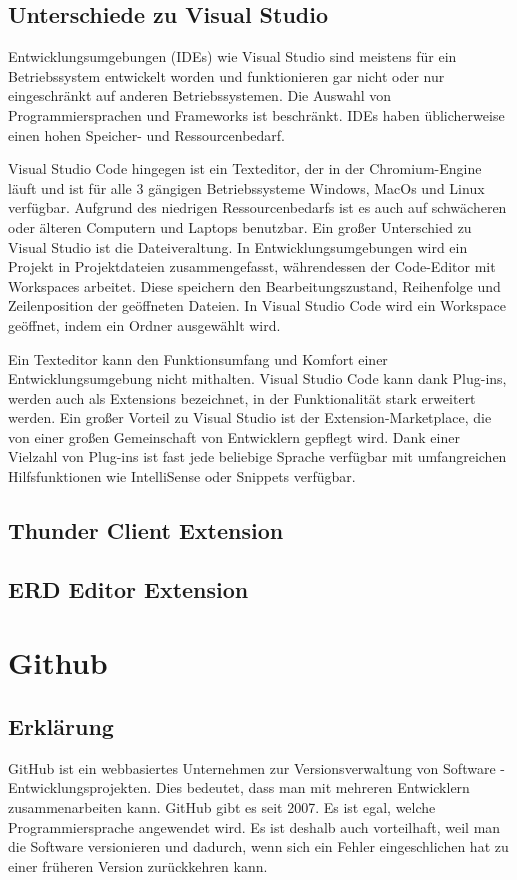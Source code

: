 \subsection{Unterschiede zu Visual Studio}
Entwicklungsumgebungen (IDEs) wie Visual Studio sind meistens für ein Betriebssystem entwickelt worden und funktionieren 
gar nicht oder nur eingeschränkt auf anderen Betriebssystemen. Die Auswahl von Programmiersprachen und Frameworks ist beschränkt. IDEs 
haben üblicherweise einen hohen Speicher- und Ressourcenbedarf.

Visual Studio Code hingegen ist ein Texteditor, der in der Chromium-Engine läuft und ist für alle 3 gängigen Betriebssysteme 
Windows, MacOs und Linux verfügbar. Aufgrund des niedrigen Ressourcenbedarfs ist es auch auf schwächeren oder älteren Computern und Laptops benutzbar.
Ein großer Unterschied zu Visual Studio ist die Dateiveraltung. 
In Entwicklungsumgebungen wird ein Projekt in Projektdateien zusammengefasst, 
währendessen der Code-Editor mit Workspaces arbeitet. Diese speichern den 
Bearbeitungszustand, Reihenfolge und Zeilenposition der geöffneten Dateien. 
In Visual Studio Code wird ein Workspace geöffnet, indem ein Ordner ausgewählt wird.

Ein Texteditor kann den Funktionsumfang und Komfort einer Entwicklungsumgebung nicht mithalten. Visual Studio Code 
kann dank Plug-ins, werden auch als Extensions bezeichnet, in der Funktionalität stark erweitert werden.
Ein großer Vorteil zu Visual Studio ist der Extension-Marketplace, die von einer großen Gemeinschaft von Entwicklern gepflegt wird.
Dank einer Vielzahl von Plug-ins ist fast jede beliebige Sprache verfügbar mit umfangreichen Hilfsfunktionen wie IntelliSense oder Snippets verfügbar.

\subsection{Thunder Client Extension}
\author{Stefano Pyringer}


\subsection{ERD Editor Extension}
\author{Stefano Pyringer}


\section{Github}
\author{Mirzet Sakonjic}
\subsection*{Erklärung}
GitHub ist ein webbasiertes Unternehmen zur Versionsverwaltung von Software - Entwicklungsprojekten. Dies bedeutet, dass man mit mehreren Entwicklern zusammenarbeiten kann. GitHub
gibt es seit 2007. Es ist egal, welche Programmiersprache angewendet wird. Es ist
deshalb auch vorteilhaft, weil man die Software versionieren und dadurch, wenn sich
ein Fehler eingeschlichen hat zu einer früheren Version zurückkehren kann.
